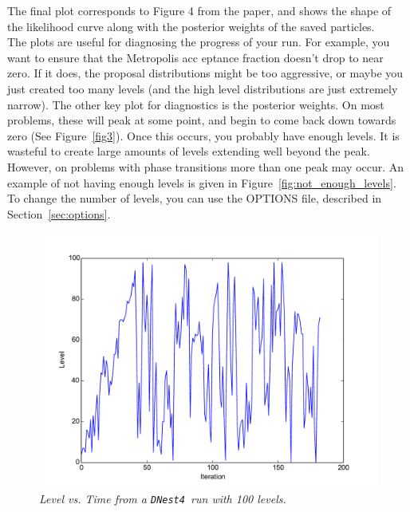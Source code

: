 \documentclass[a4paper, 11pt]{article}
\newcommand{\dnest}{{\tt DNest4}}
\begin{document}
The final plot corresponds to Figure 4 from the paper, and
shows the shape of the likelihood curve along with the posterior weights of
the saved particles.\\

The plots are useful for diagnosing the progress of your run. For example, you
want to ensure that the Metropolis acc
eptance fraction doesn't drop to near
zero. If it does, the proposal distributions might be too aggressive, or maybe
you just created too many levels (and the high level distributions are just
extremely narrow). The other key plot for diagnostics is the posterior
weights. On most problems, these will peak at some point, and begin to
come back down towards zero (See Figure~\ref{fig3}).
Once this occurs, you probably have enough levels.
It is wasteful to create large amounts of levels extending well beyond the peak.
However, on problems with phase transitions more than one peak may occur.
An example of not having enough levels is given in
Figure~\ref{fig:not_enough_levels}. To change the number of levels, you
can use the OPTIONS file, described in Section~\ref{sec:options}.\\

\begin{figure}
\begin{center}
\includegraphics[scale=0.5]{fig1.pdf}
\caption{\it Level vs. Time from a \dnest~run with 100 levels.\label{fig:fig1}}
\end{center}
\end{figure}
\end{document}
